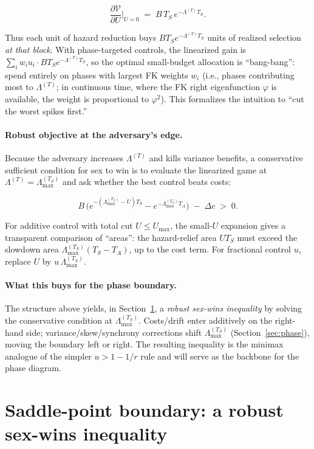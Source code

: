 \documentclass[11pt]{article}
\theoremstyle{upright}
\newcommand{\hazT}[1]{\Lambda^{(#1)}}          %
\begin{document}
$$
\frac{\partial \mathcal V}{\partial U}\Big|_{U=0}
\;=\; B\,T_S\,e^{-\hazT{T}T_S}.
$$

Thus each unit of hazard reduction buys $B T_S e^{-\hazT{T}T_S}$ units of realized selection \emph{at that block}. With phase-targeted controls, the linearized gain is $\sum_i w_i u_i\cdot B T_S e^{-\hazT{T}T_S}$, so the optimal small-budget allocation is “bang-bang”: spend entirely on phases with largest FK weights $w_i$ (i.e., phases contributing most to $\hazT{T}$; in continuous time, where the FK right eigenfunction $\varphi$ is available, the weight is proportional to $\varphi^2$). This formalizes the intuition to “cut the worst spikes first.”

\paragraph{Robust objective at the adversary’s edge.}
Because the adversary increases $\hazT{T}$ and kills variance benefits, a conservative sufficient condition for sex to win is to evaluate the linearized game at $\hazT{T}=\Lambda_{\max}^{(T_S)}$ and ask whether the best control beats costs:

$$
B\,\big(e^{-(\Lambda_{\max}^{(T_S)}-U)T_S}-e^{-\Lambda_{\max}^{(T_S)}T_A}\big)\;-\;\Delta c \;>\;0.
$$

For additive control with total cut $U\le U_{\max}$, the small-$U$ expansion gives a transparent comparison of “areas”: the hazard-relief area $U T_S$ must exceed the slowdown area $\Lambda_{\max}^{(T_S)}(T_S-T_A)$, up to the cost term. For fractional control $u$, replace $U$ by $u\,\Lambda_{\max}^{(T_S)}$.

\paragraph{What this buys for the phase boundary.}
The structure above yields, in Section~\ref{sec:saddle}, a \emph{robust sex-wins inequality} by solving the conservative condition at $\Lambda_{\max}^{(T_S)}$. Costs/drift enter additively on the right-hand side; variance/skew/synchrony corrections shift $\Lambda_{\max}^{(T_S)}$ (Section~\ref{sec:phase}), moving the boundary left or right. The resulting inequality is the minimax analogue of the simpler $u>1-1/r$ rule and will serve as the backbone for the phase diagram.


\section{Saddle-point boundary: a robust sex-wins inequality}
\label{sec:saddle}
\end{document}
